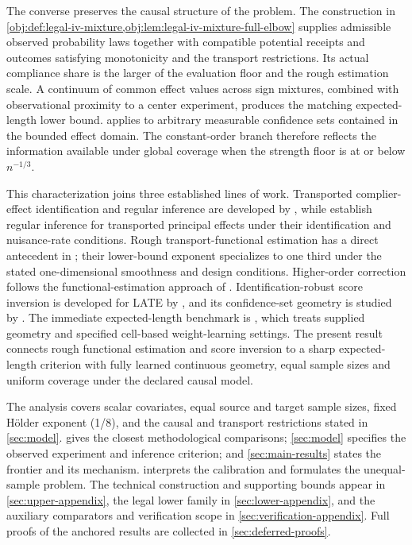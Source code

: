The converse preserves the causal structure of the problem. The construction in \cref{obj:def:legal-iv-mixture,obj:lem:legal-iv-mixture-full-elbow} supplies admissible observed probability laws together with compatible potential receipts and outcomes satisfying monotonicity and the transport restrictions. Its actual compliance share is the larger of the evaluation floor and the rough estimation scale. A continuum of common effect values across sign mixtures, combined with observational proximity to a center experiment, produces the matching expected-length lower bound.  applies to arbitrary measurable confidence sets contained in the bounded effect domain. The constant-order branch therefore reflects the information available under global coverage when the strength floor is at or below \(n^{-1/3}\).

This characterization joins three established lines of work. Transported complier-effect identification and regular inference are developed by \citet[Theorems 3.1, 4.2 and 4.3]{ChenHuang2025Generalizing}, while \citet[Theorem 6]{Clark2024} establish regular inference for transported principal effects under their identification and nuisance-rate conditions. Rough transport-functional estimation has a direct antecedent in \citet[Theorems 6 and 8]{ZengKennedyBodnarNaimi2025Efficient}; their lower-bound exponent specializes to one third under the stated one-dimensional smoothness and design conditions. Higher-order correction follows the functional-estimation approach of \citet[Section 1]{Robins2008}. Identification-robust score inversion is developed for LATE by \citet[Theorem 3.2]{Ma2026IdentificationRobust}, and its confidence-set geometry is studied by \citet[Section 3 and Theorems 1 and 2]{SmuclerLanniMasip2025Score}. The immediate expected-length benchmark is \citet{CausalSmith2026TransportedLATEStrengthFrontier}, which treats supplied geometry and specified cell-based weight-learning settings. The present result connects rough functional estimation and score inversion to a sharp expected-length criterion with fully learned continuous geometry, equal sample sizes and uniform coverage under the declared causal model.

The analysis covers scalar covariates, equal source and target sample sizes, fixed Hölder exponent (1/8), and the causal and transport restrictions stated in \cref{sec:model}.  gives the closest methodological comparisons; \cref{sec:model} specifies the observed experiment and inference criterion; and \cref{sec:main-results} states the frontier and its mechanism.  interprets the calibration and formulates the unequal-sample problem. The technical construction and supporting bounds appear in \cref{sec:upper-appendix}, the legal lower family in \cref{sec:lower-appendix}, and the auxiliary comparators and verification scope in \cref{sec:verification-appendix}. Full proofs of the anchored results are collected in \cref{sec:deferred-proofs}.
